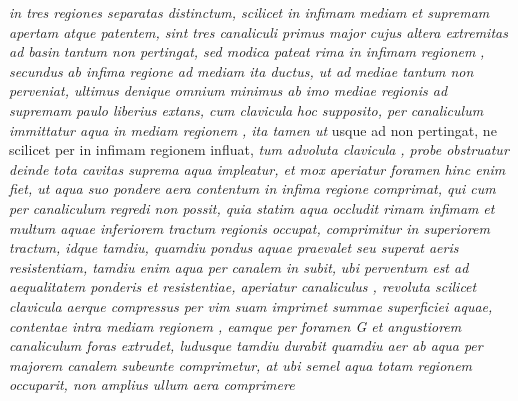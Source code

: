 \textit{in tres regiones separatas distinctum, scilicet in infimam }\textit{}\textit{ mediam }\textit{}\textit{ et supremam }\textit{}\textit{ apertam atque patentem, sint tres canaliculi primus major }\textit{}\textit{ cujus altera extremitas }\textit{}\textit{ ad basin }\textit{}\textit{ tantum non pertingat, sed modica pateat rima in infimam regionem }\textit{}\textit{, secundus }\textit{}\textit{ ab infima regione ad mediam ita ductus, ut ad }\textit{}\textit{ mediae tantum non perveniat, ultimus denique omnium minimus  ab imo mediae regionis ad supremam paulo liberius extans, cum clavicula}
\textit{}\textit{ hoc supposito, per canaliculum }\textit{}\textit{ immittatur aqua in mediam regionem }\textit{}\textit{, ita tamen ut} usque ad \textit{} non pertingat, ne scilicet per  \textit{} in infimam regionem influat, \textit{tum advoluta clavicula }\textit{}\textit{, probe obstruatur} 
\textit{}\textit{ deinde tota cavitas suprema }\textit{}\textit{ aqua impleatur, et mox aperiatur foramen} \textit{} \textit{hinc enim fiet, ut aqua suo pondere aera contentum in infima regione }\textit{}\textit{ comprimat, qui cum per canaliculum }\textit{}\textit{ regredi non possit, quia statim aqua occludit rimam infimam }\textit{}\textit{ et multum aquae inferiorem tractum regionis  occupat, comprimitur in superiorem tractum, idque tamdiu, quamdiu pondus aquae praevalet seu superat aeris resistentiam, tamdiu enim aqua per canalem  in  subit,} 
\textit{ubi perventum est ad aequalitatem ponderis et resistentiae, aperiatur canaliculus , revoluta scilicet
clavicula  aerque compressus per  vim suam imprimet summae superficiei aquae, contentae intra
mediam regionem , eamque per foramen G
et angustiorem canaliculum  foras extrudet, ludusque
tamdiu durabit quamdiu aer ab aqua per
majorem canalem  subeunte comprimetur,
at ubi semel aqua totam regionem  occuparit, non amplius ullum aera comprimere }
